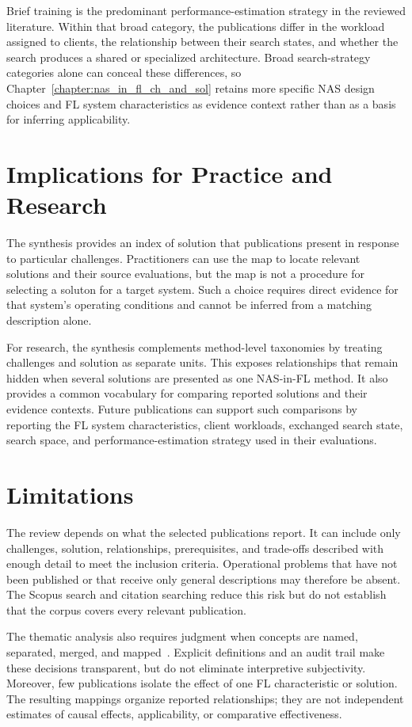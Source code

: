 Brief training is the predominant performance-estimation strategy in the reviewed literature. Within that broad category, the publications differ in the workload assigned to clients, the relationship between their search states, and whether the search produces a shared or specialized architecture. Broad search-strategy categories alone can conceal these differences, so Chapter~\ref{chapter:nas_in_fl_ch_and_sol} retains more specific NAS design choices and FL system characteristics as evidence context rather than as a basis for inferring applicability.

\section{Implications for Practice and Research}

The synthesis provides an index of solution that publications present in response to particular challenges. Practitioners can use the map to locate relevant solutions and their source evaluations, but the map is not a procedure for selecting a soluton for a target system. Such a choice requires direct evidence for that system's operating conditions and cannot be inferred from a matching description alone.

For research, the synthesis complements method-level taxonomies by treating challenges and solution as separate units. This exposes relationships that remain hidden when several solutions are presented as one NAS-in-FL method. It also provides a common vocabulary for comparing reported solutions and their evidence contexts. Future publications can support such comparisons by reporting the FL system characteristics, client workloads, exchanged search state, search space, and performance-estimation strategy used in their evaluations.

\section{Limitations}

The review depends on what the selected publications report. It can include only challenges, solution, relationships, prerequisites, and trade-offs described with enough detail to meet the inclusion criteria. Operational problems that have not been published or that receive only general descriptions may therefore be absent. The Scopus search and citation searching reduce this risk but do not establish that the corpus covers every relevant publication.

The thematic analysis also requires judgment when concepts are named, separated, merged, and mapped~\cite{using_thematic_analysis_2006}. Explicit definitions and an audit trail make these decisions transparent, but do not eliminate interpretive subjectivity. Moreover, few publications isolate the effect of one FL characteristic or solution. The resulting mappings organize reported relationships; they are not independent estimates of causal effects, applicability, or comparative effectiveness.

